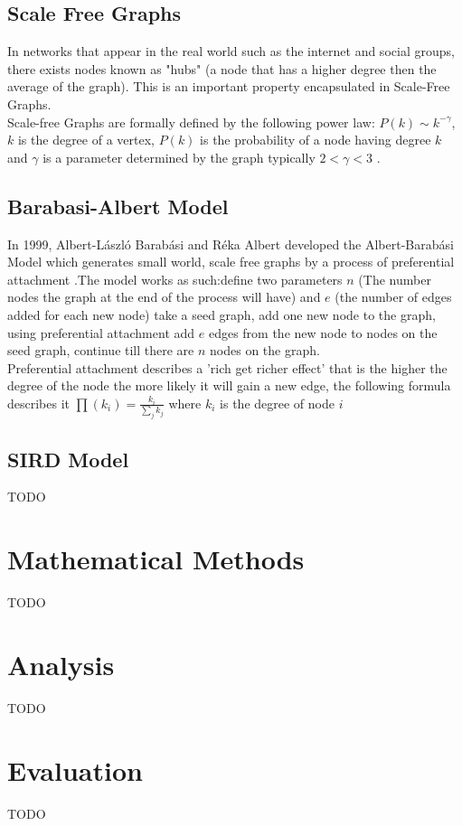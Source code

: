 \documentclass{article}
\begin{document}
        \subsection{Scale Free Graphs}
        In networks that appear in the real world such as the internet and social groups, there exists nodes known as "hubs" (a node that has a higher degree then the average of the graph). This is an important property encapsulated in Scale-Free Graphs.\\ 
        Scale-free Graphs are formally defined by the following power law: $P(k) \sim  k^{-\gamma }$, $k$ is the degree of a vertex, $P(k)$ is the probability of a node having degree $k$ and $\gamma$ is a parameter determined by the graph typically $2<\gamma<3$ \parencite{onnela2007structure}.

        \subsection{Barabasi-Albert Model}
        In 1999, Albert-László Barabási and Réka Albert developed the Albert-Barabási Model which generates small world, scale free graphs by a process of preferential attachment \parencite{barabasi1999emergence}.The model works as such:define two parameters $n$ (The number nodes the graph at the end of the process will have) and $e$ (the number of edges added for each new node) take a seed graph, add one new node to the graph, using preferential attachment add $e$ edges from the new node to nodes on the seed graph, continue till there are $n$ nodes on the graph.\\
        Preferential attachment describes a 'rich get richer effect' that is the higher the degree of the node the more likely it will gain a new edge, the following formula describes it $\prod (k_{i}) = \frac{k_{i}}{\sum_{j} {k_{j}}}$ where $k_{i}$ is the degree of node $i$
        \subsection{SIRD Model}
        TODO
    \section{Mathematical Methods}
    TODO
    \section{Analysis}
    TODO
    \section{Evaluation}
    TODO
    
    
    
    
\printbibliography
\end{document}
